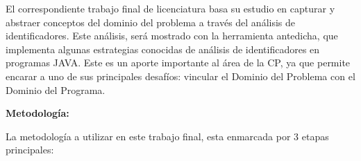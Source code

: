 \documentclass[a4paper,12pt]{report}
\begin{document}
\hspace{0.5cm} El correspondiente trabajo final de licenciatura basa su estudio en capturar y abstraer conceptos del dominio del problema a través del análisis de identificadores. Este análisis, será mostrado con la herramienta antedicha, que implementa algunas estrategias conocidas \cite{DFPM05,DMDJ13,EHPV09} de análisis de identificadores en programas JAVA.
Este es un aporte importante al área de la CP, ya que permite encarar a uno de sus principales desafíos: vincular el Dominio del Problema con el Dominio del Programa.
\vskip0.5cm

\pagebreak
{\Large \textbf{Metodología:}}
\vskip0.5cm

\hspace{0.5cm}La metodología a utilizar en este trabajo final, esta enmarcada por 3 etapas principales:
\end{document}
